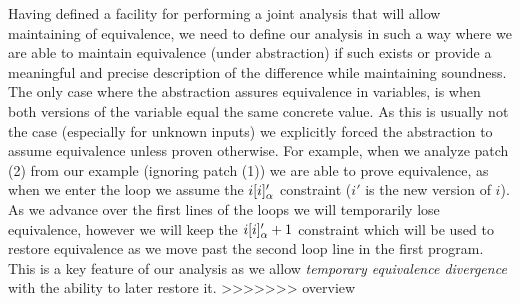 Having defined a facility for performing a joint analysis that will allow maintaining of equivalence, we need to define our analysis in such a way where we are able to maintain equivalence (under abstraction) if such exists or provide a meaningful and precise description of the difference while maintaining soundness. The only case where the abstraction assures equivalence in variables, is when both versions of the variable equal the same concrete value. As this is usually not the case (especially for unknown inputs) we explicitly forced the abstraction to assume equivalence unless proven otherwise. For example, when we analyze patch (2) from our example (ignoring patch (1)) we are able to prove equivalence, as when we enter the loop we assume the ${i [i]_{\alpha}'}$ constraint ($i'$ is the new version of $i$). As we advance over the first lines of the loops we will temporarily lose equivalence, however we will keep the ${i [i]_{\alpha}' + 1}$ constraint which will be used to restore equivalence as we move past the second loop line in the first program. This is a key feature of our analysis as we allow \emph{temporary equivalence divergence} with the ability to later restore it.
>>>>>>> overview





